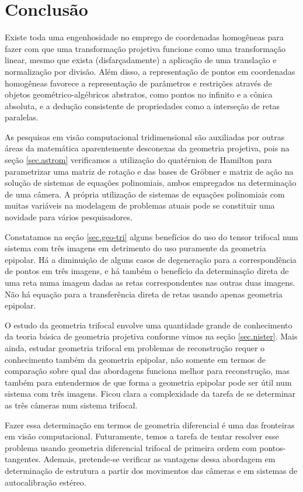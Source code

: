 \newpage
\chapter{Conclus\~ao}

Existe toda uma engenhosidade no emprego de coordenadas homogêneas para fazer com que uma transformação projetiva funcione como uma transformação linear, mesmo que exista (disfarçadamente) a aplicação de uma translação e normalização por divisão. Além disso, a representação de pontos em coordenadas homogêneas favorece a representação de parâmetros e restrições através de objetos geométrico-algébricos abstratos, como pontos no infinito e a cônica absoluta, e a dedução consistente de propriedades como a interseção de retas paralelas.

As pesquisas em visão computacional tridimensional são auxiliadas por outras áreas da matemática aparentemente desconexas da geometria projetiva, pois na seção \ref{sec.astrom} verificamos a utilização do quatérnion de Hamilton para parametrizar uma matriz de rotação e das bases de Gr\"obner e matriz de ação na solução de sistemas de equações polinomiais, ambos empregados na determinação de uma câmera. A própria utilização de sistemas de equações polinomiais com muitas variáveis na modelagem de problemas atuais pode se constituir uma novidade para vários pesquisadores.

Constatamos na seção \ref{sec.geo-tri} alguns benefícios do uso do tensor trifocal num sistema com três imagens em detrimento do uso puramente da geometria epipolar. Há a diminuição de alguns casos de degeneração para a correspondência de pontos em três imagens, e há também o benefício da determinação direta de uma reta numa imagem dadas as retas correspondentes nas outras duas imagens. Não há equação para a transferência direta de retas usando apenas geometria epipolar.

O estudo da geometria trifocal envolve uma quantidade grande de conhecimento da teoria básica de geometria projetiva conforme vimos na seção \ref{sec.nister}. Mais ainda, estudar geometria trifocal em problemas de reconstrução requer o conhecimento também da geometria epipolar, não somente em termos de comparação sobre qual das abordagens funciona melhor para reconstrução, mas também para entendermos de que forma a geometria epipolar pode ser útil num sistema com três imagens. Ficou clara a complexidade da tarefa de se determinar as três câmeras num sistema trifocal.

Fazer essa determinação em termos de geometria diferencial é uma das fronteiras em visão computacional. Futuramente, temos a tarefa de tentar resolver esse problema usando geometria diferencial trifocal de primeira ordem com pontos-tangentes. Ademais, pretende-se verificar as vantagens dessa abordagem em determinação de estrutura a partir dos movimentos das câmeras e em sistemas de autocalibração estéreo.

